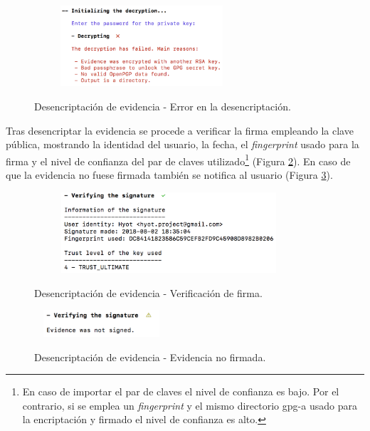 \documentclass[12pt,a4paper, twoside]{report}
\begin{document}
		\begin{figure}[!ht]   
			\caption{Desencriptación de evidencia - Error en la desencriptación.} 
			\begin{center} 					\includegraphics[width=8cm,height=3cm]{Images/userGuide/evidence/error_decryption} \\
				\label{fig:userguide_evidence_error_decryption} 
			\end{center}  
		\end{figure}

	Tras desencriptar la evidencia se procede a verificar la firma empleando la clave pública, mostrando la identidad del usuario, la fecha, el \textit{fingerprint} usado para la firma y el nivel de confianza del par de claves utilizado\footnote{En caso de importar el par de claves el nivel de confianza es bajo. Por el contrario, si se emplea un \textit{fingerprint} y el mismo directorio \gls{gpg-a} usado para la encriptación y firmado el nivel de confianza es alto.} (Figura \ref{fig:userguide_evidence_sign}). En caso de que la evidencia no fuese firmada también se notifica al usuario (Figura \ref{fig:userguide_evidence_notsigned}). \\
	
		\begin{figure}[!ht]   
			\caption{Desencriptación de evidencia - Verificación de firma.} 
			\begin{center} 					\includegraphics[width=10cm,height=3cm]{Images/userGuide/evidence/sign} \\
				\label{fig:userguide_evidence_sign} 
			\end{center}  
		\end{figure}
		
		\newpage
		
		\begin{figure}[!ht]   
			\caption{Desencriptación de evidencia - Evidencia no firmada.} 
			\begin{center} 					
				\includegraphics[width=5cm,height=1cm]{Images/userGuide/evidence/notsigned} \\
				\label{fig:userguide_evidence_notsigned} 
			\end{center}  
		\end{figure}
\end{document}
